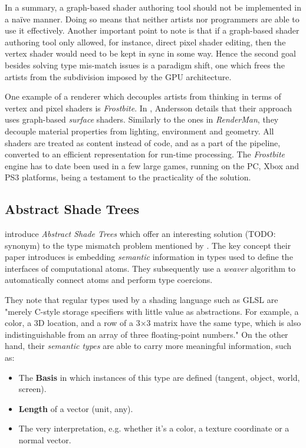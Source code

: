 In a summary, a graph-based shader authoring tool should not be implemented in a naïve manner. Doing so means that neither artists nor programmers are able to use it effectively. Another important point to note is that if a graph-based shader authoring tool only allowed, for instance, direct pixel shader editing, then the vertex shader would need to be kept in sync in some way. Hence the second goal besides solving type mis-match issues is a paradigm shift, one which frees the artists from the subdivision imposed by the GPU architecture.

One example of a renderer which decouples artists from thinking in terms of vertex and pixel shaders is \emph{Frostbite}. In \cite{AT07}, Andersson details that their approach uses graph-based \emph{surface} shaders. Similarly to the ones in \emph{RenderMan}, they decouple material properties from lighting, environment and geometry. All shaders are treated as content instead of code, and as a part of the pipeline, converted to an efficient representation for run-time processing. The \emph{Frostbite} engine has to date been used in a few large games, running on the PC, Xbox and PS3 platforms, being a testament to the practicality of the solution.

\subsection{Abstract Shade Trees}

\citet{mcguire2006shadetrees} introduce \emph{Abstract Shade Trees} which offer an interesting solution (TODO: synonym) to the type mismatch problem mentioned by \citet{AbramWhitted90}. The key concept their paper introduces is embedding \emph{semantic} information in types used to define the interfaces of computational atoms. They subsequently use a \emph{weaver} algorithm to automatically connect atoms and perform type coercions.

They note that regular types used by a shading language such as GLSL are "merely C-style storage specifiers with little value as abstractions. For example, a color, a 3D location, and a row of a 3×3 matrix have the same type, which is also indistinguishable from an array of three floating-point numbers." On the other hand, their \emph{semantic types} are able to carry more meaningful information, such as:
\begin{itemize}
\item The \textbf{Basis} in which instances of this type are defined (tangent, object, world, screen).
\item \textbf{Length} of a vector (unit, any).
\item The very interpretation, e.g. whether it's a color, a texture coordinate or a normal vector.
\end{itemize}

